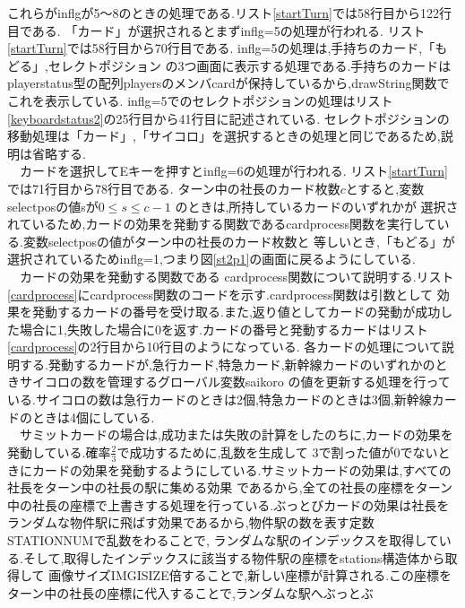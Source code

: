 \documentclass[a4j]{jarticle}
\begin{document}
        これらがinflgが5～8のときの処理である.リスト\ref{startTurn}では58行目から122行目である.
        「カード」が選択されるとまずinflg=5の処理が行われる. リスト\ref{startTurn}では58行目から70行目である. 
        inflg=5の処理は,手持ちのカード,「もどる」,セレクトポジション
        の3つ画面に表示する処理である.手持ちのカードはplayerstatus型の配列playersのメンバcardが保持しているから,drawString関数で
        これを表示している. inflg=5でのセレクトポジションの処理はリスト\ref{keyboardstatus2}の25行目から41行目に記述されている.
        セレクトポジションの移動処理は「カード」,「サイコロ」を選択するときの処理と同じであるため,説明は省略する.\\
        　カードを選択してEキーを押すとinflg=6の処理が行われる. リスト\ref{startTurn}では71行目から78行目である. 
        ターン中の社長のカード枚数$c$とすると,変数selectposの値sが$0 \leq s \leq c-1$ のときは,所持しているカードのいずれかが
        選択されているため,カードの効果を発動する関数であるcardprocess関数を実行している.変数selectposの値がターン中の社長のカード枚数と
        等しいとき,「もどる」が選択されているためinflg=1,つまり図\ref{st2p1}の画面に戻るようにしている.\\
        　カードの効果を発動する関数である
        cardprocess関数について説明する.リスト\ref{cardprocess}にcardprocess関数のコードを示す.cardprocess関数は引数として
        効果を発動するカードの番号を受け取る.また,返り値としてカードの発動が成功した場合に1,失敗した場合に0を返す.カードの番号と発動するカードはリスト\ref{cardprocess}の2行目から10行目のようになっている.
        各カードの処理について説明する.発動するカードが,急行カード,特急カード,新幹線カードのいずれかのときサイコロの数を管理するグローバル変数saikoro
        の値を更新する処理を行っている.サイコロの数は急行カードのときは2個,特急カードのときは3個,新幹線カードのときは4個にしている.\\
        　サミットカードの場合は,成功または失敗の計算をしたのちに,カードの効果を発動している.確率$\frac{2}{3}$で成功するために,乱数を生成して
        3で割った値が0でないときにカードの効果を発動するようにしている.サミットカードの効果は,すべての社長をターン中の社長の駅に集める効果
        であるから,全ての社長の座標をターン中の社長の座標で上書きする処理を行っている.ぶっとびカードの効果は社長をランダムな物件駅に飛ばす効果であるから,物件駅の数を表す定数STATIONNUMで乱数をわることで,
        ランダムな駅のインデックスを取得している.そして,取得したインデックスに該当する物件駅の座標をstations構造体から取得して
        画像サイズIMGISIZE倍することで,新しい座標が計算される.この座標をターン中の社長の座標に代入することで,ランダムな駅へぶっとぶ
\end{document}
